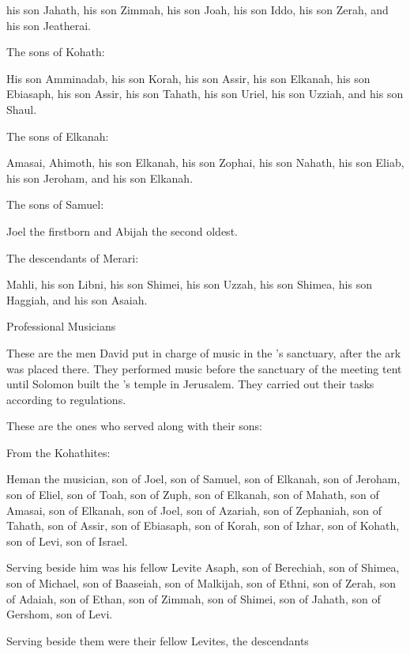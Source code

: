 {his son
Jahath,
his son
Zimmah,
his son
Joah,
his son
Iddo,
his son
Zerah,
and his son
Jeatherai.
\par }{\PP {}The sons
of Kohath:
\par }{\PP His son
Amminadab,
his son
Korah,
his son
Assir,
his son
Elkanah,
his son
Ebiasaph,
his son
Assir,
his son Tahath,
his son
Uriel,
his son
Uzziah,
and his son
Shaul.
\par }{\PP {}The sons
of Elkanah:
\par }{\PP Amasai,
Ahimoth,
his son
Elkanah,
his son
Zophai,
his son
Nahath,
his son
Eliab,
his son
Jeroham,
and his son
Elkanah.
\par }{\PP {}The sons
of Samuel:
\par }{\PP Joel
the firstborn
and Abijah the second oldest.
\par }{\PP {}The descendants
of Merari:
\par }{\PP Mahli,
his son
Libni,
his son
Shimei,
his son
Uzzah,
his son
Shimea,
his son
Haggiah,
and his son
Asaiah.
\par }{\SH Professional Musicians
\par }{\PP {}These
are the men David
put in charge
of music
in the
{}’s
sanctuary,
after the ark
was placed there.
They performed
music
before
the sanctuary
of the meeting
tent
until
Solomon
built
the
{}’s
temple
in Jerusalem.
They carried out their tasks
according to regulations.
\par }{\PP {}These
are the ones who served
along with their sons:
\par }{\PP From the Kohathites:
\par }{\PP Heman
the musician,
son
of Joel,
son
of Samuel,
son
of Elkanah,
son
of Jeroham,
son
of Eliel,
son
of Toah,
son
of Zuph,
son
of Elkanah,
son
of Mahath,
son
of Amasai,
son
of Elkanah,
son
of Joel,
son
of Azariah,
son
of Zephaniah,
son
of Tahath,
son
of Assir,
son
of Ebiasaph,
son
of Korah,
son
of Izhar,
son
of Kohath,
son
of Levi,
son
of Israel.
\par }{\PP {}Serving beside
him
was his fellow
Levite Asaph,
son
of Berechiah,
son
of Shimea,
son
of Michael,
son
of Baaseiah,
son
of Malkijah,
son
of Ethni,
son
of Zerah,
son
of Adaiah,
son
of Ethan,
son
of Zimmah,
son
of Shimei,
son
of Jahath,
son
of Gershom,
son
of Levi.
\par }{\PP {}Serving beside
them were their fellow
Levites, the descendants
}

